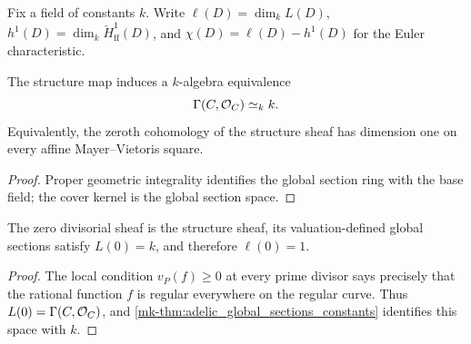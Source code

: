 \begin{definition}
  \label{mk-def:adelic_chi_ledger}
  \leanok
  Fix a field of constants \(k\). Write \(\ell(D) = \dim_k L(D)\),
  \(h^1(D) = \dim_k \check{H}^1_{\mathrm{ff}}(D)\), and
  \(\chi(D) = \ell(D) - h^1(D)\)
  for the Euler characteristic.
\end{definition}

\begin{theorem}
  \label{mk-thm:adelic_global_sections_constants}
  \leanok

  The structure map induces a \(k\)-algebra equivalence
  \[
    \Gamma(C,\mathcal{O}_{C})\simeq_k k.
  \]
  Equivalently, the zeroth cohomology of the structure sheaf has dimension
  one on every affine Mayer--Vietoris square.
\end{theorem}
\begin{proof}
  \leanok
  Proper geometric integrality identifies the global section ring with the
  base field; the cover kernel is the global section space.
\end{proof}

\begin{corollary}
  \label{mk-thm:adelic_ell_zero}
  The zero divisorial sheaf is the structure sheaf, its valuation-defined
  global sections satisfy \(L(0)=k\), and therefore \(\ell(0)=1\).
\end{corollary}
\begin{proof}
  The local condition \(v_P(f)\ge0\) at every prime divisor says precisely
  that the rational function \(f\) is regular everywhere on the regular
  curve.  Thus \(L(0)=\Gamma(C,\mathcal{O}_{C})\), and
  \ref{mk-thm:adelic_global_sections_constants} identifies this space with
  \(k\).
\end{proof}

